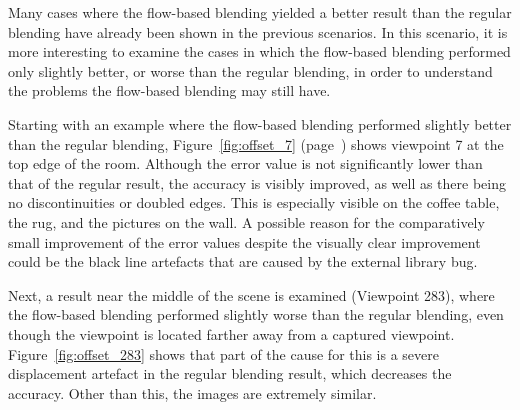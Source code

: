 Many cases where the flow-based blending yielded a better result than the regular blending have already been shown in the previous scenarios. In this scenario, it is more interesting to examine the cases in which the flow-based blending performed only slightly better, or worse than the regular blending, in order to understand the problems the flow-based blending may still have.

Starting with an example where the flow-based blending performed slightly better than the regular blending, Figure~\ref{fig:offset_7} (page~\pageref{fig:offset_7}) shows viewpoint 7 at the top edge of the room. Although the error value is not significantly lower than that of the regular result, the accuracy is visibly improved, as well as there being no discontinuities or doubled edges. This is especially visible on the coffee table, the rug, and the pictures on the wall. A possible reason for the comparatively small improvement of the error values despite the visually clear improvement could be the black line artefacts that are caused by the external library bug.

Next, a result near the middle of the scene is examined (Viewpoint 283), where the flow-based blending performed slightly worse than the regular blending, even though the viewpoint is located farther away from a captured viewpoint. Figure~\ref{fig:offset_283} shows that part of the cause for this is a severe displacement artefact in the regular blending result, which decreases the accuracy. Other than this, the images are extremely similar.

